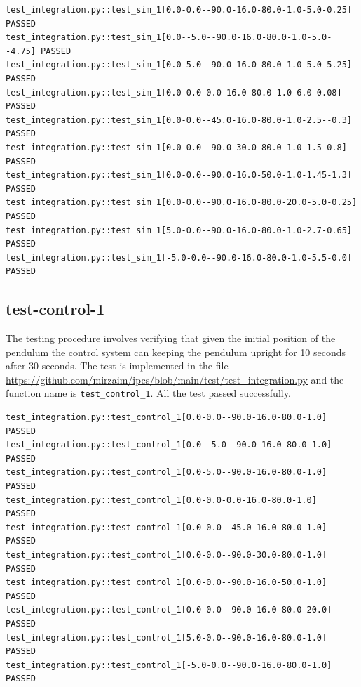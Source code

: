 \documentclass[12pt, titlepage]{article}
\begin{document}
\begin{small}
  \begin{verbatim}
test_integration.py::test_sim_1[0.0-0.0--90.0-16.0-80.0-1.0-5.0-0.25]   PASSED 
test_integration.py::test_sim_1[0.0--5.0--90.0-16.0-80.0-1.0-5.0--4.75] PASSED
test_integration.py::test_sim_1[0.0-5.0--90.0-16.0-80.0-1.0-5.0-5.25]   PASSED 
test_integration.py::test_sim_1[0.0-0.0-0.0-16.0-80.0-1.0-6.0-0.08]     PASSED   
test_integration.py::test_sim_1[0.0-0.0--45.0-16.0-80.0-1.0-2.5--0.3]   PASSED 
test_integration.py::test_sim_1[0.0-0.0--90.0-30.0-80.0-1.0-1.5-0.8]    PASSED  
test_integration.py::test_sim_1[0.0-0.0--90.0-16.0-50.0-1.0-1.45-1.3]   PASSED 
test_integration.py::test_sim_1[0.0-0.0--90.0-16.0-80.0-20.0-5.0-0.25]  PASSED
test_integration.py::test_sim_1[5.0-0.0--90.0-16.0-80.0-1.0-2.7-0.65]   PASSED 
test_integration.py::test_sim_1[-5.0-0.0--90.0-16.0-80.0-1.0-5.5-0.0]   PASSED
  \end{verbatim}
\end{small}

\subsection{test-control-1}
The testing procedure involves verifying that given the initial
position of the pendulum the control system can keeping the pendulum
upright for 10 seconds after 30 seconds.
The test is implemented in the file 
\url{https://github.com/mirzaim/ipcs/blob/main/test/test_integration.py}
and the function name is \texttt{test\_control\_1}.
All the test passed successfully.

\begin{small}
  \begin{verbatim}
test_integration.py::test_control_1[0.0-0.0--90.0-16.0-80.0-1.0]  PASSED 
test_integration.py::test_control_1[0.0--5.0--90.0-16.0-80.0-1.0] PASSED
test_integration.py::test_control_1[0.0-5.0--90.0-16.0-80.0-1.0]  PASSED 
test_integration.py::test_control_1[0.0-0.0-0.0-16.0-80.0-1.0]    PASSED   
test_integration.py::test_control_1[0.0-0.0--45.0-16.0-80.0-1.0]  PASSED 
test_integration.py::test_control_1[0.0-0.0--90.0-30.0-80.0-1.0]  PASSED 
test_integration.py::test_control_1[0.0-0.0--90.0-16.0-50.0-1.0]  PASSED 
test_integration.py::test_control_1[0.0-0.0--90.0-16.0-80.0-20.0] PASSED
test_integration.py::test_control_1[5.0-0.0--90.0-16.0-80.0-1.0]  PASSED 
test_integration.py::test_control_1[-5.0-0.0--90.0-16.0-80.0-1.0] PASSED
  \end{verbatim}
\end{small}
\end{document}

